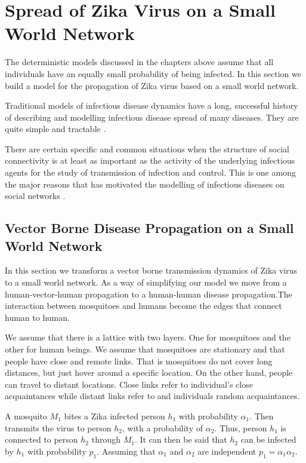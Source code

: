 \chapter{ Spread of Zika Virus on a Small World Network }

The deterministic models discussed in the chapters above assume that all individuals have an equally small probability of being infected. In this section we build a model for the propagation of Zika virus based on a small world network.

Traditional models of infectious disease dynamics have a long, successful history of describing and modelling infectious disease spread of many diseases. They are quite simple and tractable \citep{fu2013propagation}.

There are certain specific and common situations when the structure of social connectivity is at least as important as the  activity of the underlying infectious agents for the study of transmission of infection and control. This is one among the major reasons that has motivated the modelling of infectious diseases on social networks \cite{fu2013propagation}.



\section{ Vector Borne Disease Propagation on a Small World Network}

In this section we transform a vector borne transmission dynamics of Zika virus to a small world network. As a way of simplifying our model we move from a human-vector-human propagation to a human-human disease propagation.The interaction between mosquitoes and humans become the edges that connect human to human.

We assume that there is a lattice with two layers. One for mosquitoes and the other for human beings. We assume that mosquitoes are stationary and that people have close and remote links. That is mosquitoes do not cover long distances, but just hover around a specific location.
On the other hand, people can travel to distant locations. Close links refer to individual's close acquaintances while distant links refer to and individuals random acquaintances.
 
A mosquito $M_1$ bites a Zika infected person $h_1$ with probability $\alpha_1$. Then transmits the virus to person $h_2$, with a probability of $\alpha_2$. Thus, person $h_1$ is connected to  person $h_2$ through $M_1$. It can then be said that $h_2$ can be infected by $h_1$ with probability $p_1$. Assuming that $\alpha_1 $ and $\alpha_2$ are independent  $p_1 =  \alpha_1 \alpha_2$. 

